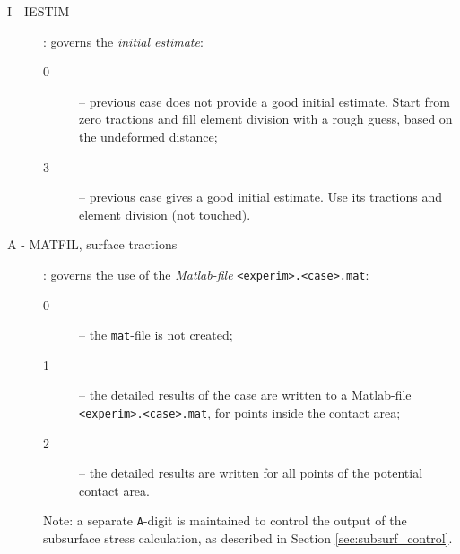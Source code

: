 \documentclass[12pt]{report}
\renewcommand{\magenta}[1]{}
\begin{document}
\begin{description}
\item[I - IESTIM] \label{i-digit} : governs the {\em initial estimate\/}:
\begin{description}
\item[0] -- previous case does not provide a good initial estimate. Start
        from zero tractions and fill element division with a rough guess,
        based on the undeformed distance;
\magenta{
\item[1] -- use previous solution, regularize tractions. The element
        division of the previous case is used as initial estimate, and the
        tractions are adjusted to this state;
\item[2] -- use normal part of previous case only. The normal tractions are
        maintained, but all elements start with zero tangential tractions,
        in the adhesion area;
}
\item[3] -- previous case gives a good initial estimate. Use its tractions
        and element division (not touched).
\end{description}

\item[A - MATFIL, surface tractions] \label{a-digit} : governs the use of
        the {\em Matlab-file\/} {\tt <experim>.\-<case>\-.mat}:
\begin{description}
\item[0] -- the {\tt mat}-file is not created;
\item[1] -- the detailed results of the case are written to a Matlab-file
        {\tt <experim>.<case>.mat}, for points inside the contact area;
\item[2] -- the detailed results are written for all points of the potential
        contact area.
\end{description}
Note: a separate {\tt A}-digit is maintained to control the output
of the subsurface stress calculation, as described in Section
\ref{sec:subsurf_control}.


\end{description}
\end{document}
